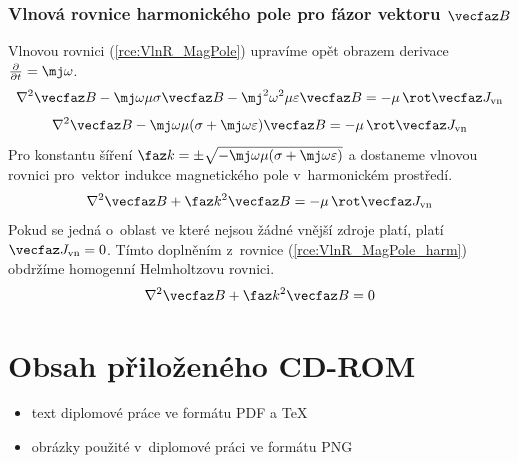 \subsection*{Vlnová rovnice harmonického pole pro fázor vektoru $\vecfaz B$}
Vlnovou rovnici (\ref{rce:VlnR_MagPole}) upravíme opět obrazem derivace $\frac{\partial}{\partial t}=\mj\omega$.
\begin{displaymath}
	\nabla^{2}\vecfaz B - \mj\omega\mu\sigma\vecfaz B - \mj^{2}\omega^{2}\mu\varepsilon\vecfaz B = -\mu\,\rot\vecfaz J_{\mathrm{vn}}
\end{displaymath}
\begin{displaymath}
	\nabla^{2}\vecfaz B - \mj\omega\mu(\sigma + \mj\omega\varepsilon)\vecfaz B = -\mu\,\rot\vecfaz J_{\mathrm{vn}}
\end{displaymath}
Pro konstantu šíření $\faz k=\pm\sqrt{-\mj\omega\mu(\sigma+\mj\omega\varepsilon)}$ a dostaneme vlnovou rovnici pro~vektor indukce magnetického pole v~harmonickém prostředí.
\begin{equation}
	\nabla^{2}\vecfaz B +\faz k^{2}\vecfaz B = -\mu\,\rot\vecfaz J_{\mathrm{vn}}
	\label{rce:VlnR_MagPole_harm} 
\end{equation}
Pokud se jedná o~oblast ve které nejsou žádné vnější zdroje platí, platí $\vecfaz J_{\mathrm{vn}} = 0$. Tímto doplněním z~rovnice  (\ref{rce:VlnR_MagPole_harm}) obdržíme homogenní Helmholtzovu rovnici.
\begin{equation}
	\nabla^{2}\vecfaz B +\faz k^{2}\vecfaz B = 0
	\label{rce:VlnR_MagPole_harm_BezZdroju} 
\end{equation}

\chapter{Obsah přiloženého CD-ROM} \label{kap:Obsah_CD}
\begin{itemize}
\item text diplomové práce ve formátu PDF a \TeX{}
\item obrázky použité v~diplomové práci ve formátu PNG
\end{itemize}

